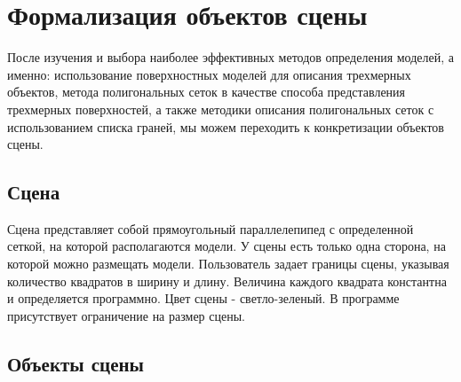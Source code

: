 


\section{Формализация объектов сцены}
 
После изучения и выбора наиболее эффективных методов определения моделей, а именно: использование поверхностных моделей для описания трехмерных объектов, метода полигональных сеток в качестве способа представления трехмерных поверхностей, а также методики описания полигональных сеток с использованием списка граней, мы можем переходить к конкретизации объектов сцены.

\subsection{Сцена}
Сцена представляет собой прямоугольный параллелепипед с определенной сеткой, на которой располагаются модели. У сцены есть только одна сторона, на которой можно размещать модели. Пользователь задает границы сцены, указывая количество квадратов в ширину и длину. Величина каждого квадрата константна и определяется программно. Цвет сцены - светло-зеленый. В программе присутствует ограничение на размер сцены.


\subsection{Объекты сцены}

